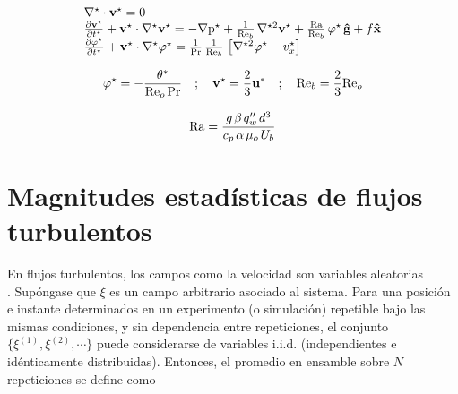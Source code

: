 \begin{equation}
\begin{array}{l}
    \nabla^{\star} \cdot \mathbf{v^{\star}} = 0 \\
    \frac{\partial \mathbf{v^{\star}}}{\partial t^{\star}} + \mathbf{v^{\star}} \cdot \nabla^{\star} \mathbf{v^{\star}} = 
    -\nabla \text{p}^{\star} + \frac{1}{\text{Re}_b} \hspace{0.5mm} \nabla^{{\star}2} \mathbf{v^{\star}} + \frac{\text{Ra}}{\text{Re}_b} \hspace{0.5mm} \varphi^{\star} \hspace{0.5mm} \mathbf{\hat{g}} + f \mathbf{\hat{x}} \\
    \frac{\partial \varphi^{\star}}{\partial t^{\star}} + \mathbf{v^{\star}} \cdot \nabla^{\star} \varphi^{\star} = 
    \frac{1}{\text{Pr}}\hspace{0.5mm}  \frac{1}{\text{Re}_b} \hspace{0.5mm} \left[ \nabla^{{\star}2} \varphi^{\star} - v_x^{\star} \right]  
\end{array}
\label{eq:gob_system_res2}
\end{equation}

\begin{equation*}
\varphi^{\star} = -  \frac{\theta^*}{\text{Re}_o \hspace{0.5mm} \text{Pr}}  \quad ; \quad \mathbf{v^{\star}} = \frac{2}{3} \mathbf{u^*} \quad ; \quad \text{Re}_b = \frac{2}{3} \text{Re}_o
\end{equation*}  

\begin{equation}
\text{Ra} = \frac{g \hspace{0.5mm} \beta \hspace{0.5mm} q''_w \hspace{0.5mm} d^3}{c_p \hspace{0.5mm} \alpha \hspace{0.5mm} \mu_o \hspace{0.5mm} U_b}
\label{eq:Rayleigh}
\end{equation} 


\section{Magnitudes estadísticas de flujos turbulentos} \label{sec:mag-stat}

En flujos turbulentos, los campos como la velocidad son variables aleatorias \\ \cite{pope2001turbulent}. Supóngase que $\xi$ es un campo arbitrario asociado al sistema. Para una posición e instante determinados en un experimento (o simulación) repetible bajo las mismas condiciones, y sin dependencia entre repeticiones, el conjunto $\lbrace \xi^{(1)}, \xi^{(2)}, \cdots \rbrace$ puede considerarse de variables i.i.d. (independientes e idénticamente distribuidas). Entonces, el promedio en ensamble sobre $N$ repeticiones se define como 


